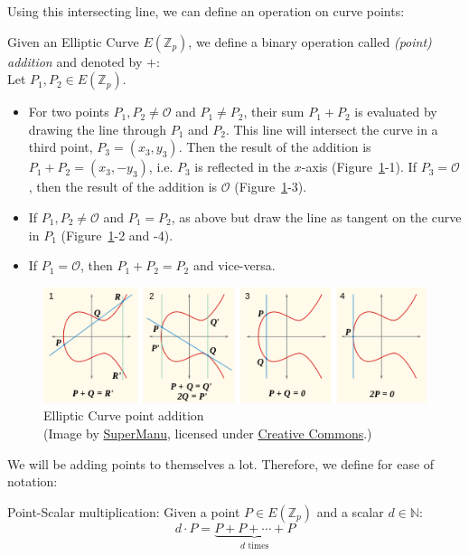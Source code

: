 Using this intersecting line, we can define an operation on curve points:
\begin{definition}
    \label{def:point-add}
    Given an Elliptic Curve $E(\mathbb{Z}_p)$, we define a binary operation called \emph{(point) addition} and denoted by $+$:~\cite{katz_introduction_2015}\\
    Let $P_1, P_2 \in E(\mathbb{Z}_p)$.

    \begin{itemize}
        \item For two points $P_1, P_2 \neq \mathcal{O}$ and $P_1 \neq P_2$, their sum $P_1 + P_2$ is evaluated by drawing the line through $P_1$ and $P_2$. 
            This line will intersect the curve in a third point, $P_3 = (x_3, y_3)$.
            Then the result of the addition is $P_1 + P_2 = (x_3, -y_3)$, i.e. $P_3$ is reflected in the $x$-axis (Figure~\ref{fig:ecc-point-addition}-1).
            If $P_3 = \mathcal{O}$, then the result of the addition is $\mathcal{O}$ (Figure~\ref{fig:ecc-point-addition}-3).
        \item If $P_1, P_2 \neq \mathcal{O}$ and $P_1 = P_2$, as above but draw the line as tangent on the curve in $P_1$ (Figure~\ref{fig:ecc-point-addition}-2 and -4).
        \item If $P_1 = \mathcal{O}$, then $P_1 + P_2 = P_2$ and vice-versa.
    \end{itemize}
\end{definition} 

\begin{figure}
    \includegraphics[width=\textwidth]{figures/ecc_point_addition.png}
    \caption[Elliptic Curve point addition]{Elliptic Curve point addition\\(Image by \href{https://commons.wikimedia.org/wiki/File:ECClines-2.svg}{SuperManu}, licensed under \href{https://creativecommons.org/licenses/by-sa/3.0/deed.en}{Creative Commons}.)}
    \label{fig:ecc-point-addition}
\end{figure}

We will be adding points to themselves a lot. Therefore, we define for ease of notation:
\begin{definition}
    Point-Scalar multiplication: Given a point $P \in E(\mathbb{Z}_p)$ and a scalar $d \in \mathbb{N}$: 
    \begin{equation}
        d \cdot P = \underbrace{P + P + \cdots + P}_{d \text{ times}}
    \end{equation}
\end{definition}
 
